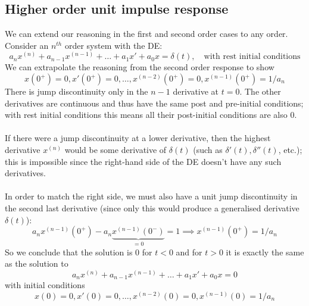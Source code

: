 \documentclass{report}
\begin{document}
\subsection{Higher order unit impulse response}
We can extend our reasoning in the first and second order cases to any order. Consider an $n^{th}$ order system 
with the DE:
\begin{equation*}
a_nx^{(n)}+a_{n-1}x^{(n-1)}+\ldots+a_1x'+a_0x=\delta(t),\quad\text{with rest initial conditions}
\end{equation*}
We can extrapolate the reasoning from the second order response to show
\begin{equation*}
x(0^+)=0,x'(0^+)=0,\ldots,x^{(n-2)}(0^+)=0,x^{(n-1)}(0^+)=1/a_n
\end{equation*}
There is jump discontinuity only in the $n-1$ derivative at $t=0$. The other derivatives are continuous and
thus have the same post and pre-initial conditions; with rest initial conditions this means all their 
post-initial conditions are also 0.\\
\vspace{1mm}\\
If there were a jump discontinuity at a lower derivative, then the highest derivative $x^{(n)}$ would be
some derivative of $\delta(t)$ (such as $\delta'(t),\delta''(t)$, etc.); this is impossible since the right-hand
side of the DE doesn't have any such derivatives.\\
\vspace{1mm}\\
In order to match the right side, we must also have a unit jump discontinuity in the second last derivative
(since only this would produce a generalised
derivative $\delta(t)$):
\begin{equation*}
a_nx^{(n-1)}(0^+)-a_n\underbrace{x^{(n-1)}(0^-)}_{=0}=1\implies x^{(n-1)}(0^+)=1/a_n
\end{equation*}
So we conclude that the solution is 0 for $t<0$ and for $t>0$ it is exactly the same as the solution to
\begin{equation*}
a_nx^{(n)}+a_{n-1}x^{(n-1)}+\ldots+a_1x'+a_0x=0
\end{equation*}
with initial conditions
\begin{equation*}
x(0)=0,x'(0)=0,\ldots,x^{(n-2)}(0)=0,x^{(n-1)}(0)=1/a_n
\end{equation*}
\newpage
\end{document}
